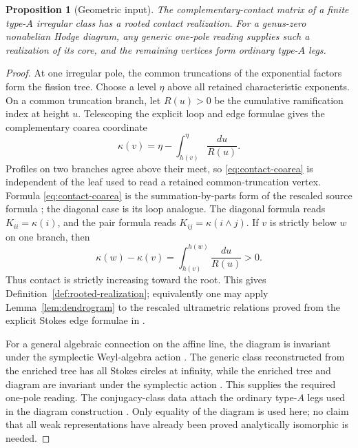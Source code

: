 \documentclass[11pt,a4paper]{amsart}
\theoremstyle{plain}
\newtheorem{proposition}[theorem]{Proposition}
\theoremstyle{definition}
\begin{document}
\begin{proposition}[Geometric input]\label{prop:geometric-input}
The complementary-contact matrix of a finite type-$A$ irregular class has a rooted contact
realization.  For a genus-zero nonabelian Hodge diagram, any generic one-pole reading supplies such
a realization of its core, and the remaining vertices form ordinary type-$A$ legs.
\end{proposition}

\begin{proof}
At one irregular pole, the common truncations of the exponential factors form the fission tree.
Choose a level $\eta$ above all retained characteristic exponents.  On a common truncation branch,
let $R(u)>0$ be the cumulative ramification index at height $u$.  Telescoping the explicit loop and
edge formulae gives the complementary coarea coordinate
\begin{equation}\label{eq:contact-coarea}
 \kappa(v)=\eta-\int_{h(v)}^\eta\frac{du}{R(u)}.
\end{equation}
Profiles on two branches agree above their meet, so \eqref{eq:contact-coarea} is independent of
the leaf used to read a retained common-truncation vertex.  Formula
\eqref{eq:contact-coarea} is the summation-by-parts form of the rescaled source formula
\cite[Lemma~4.3]{Doucot2025Graphs}; the diagonal case is its loop analogue.  The diagonal formula reads
$K_{ii}=\kappa(i)$, and the pair formula reads $K_{ij}=\kappa(i\wedge j)$.  If $v$ is strictly below
$w$ on one branch, then
\[
 \kappa(w)-\kappa(v)=\int_{h(v)}^{h(w)}\frac{du}{R(u)}>0.
\]
Thus contact is strictly increasing toward the root.  This gives
Definition~\ref{def:rooted-realization}; equivalently one may apply Lemma~\ref{lem:dendrogram} to
the rescaled ultrametric relations proved from the explicit Stokes edge formulae in
\cite[Theorem~4.2]{Doucot2025Graphs}.

For a general algebraic connection on the affine line, the diagram is invariant under the
symplectic Weyl-algebra action \cite{Doucot2021Diagrams}.  The generic class reconstructed from the
enriched tree has all Stokes circles at infinity, while the enriched tree and diagram are invariant
under the symplectic action \cite[Theorems~1.4--1.6]{Doucot2026Basic}.  This supplies the required
one-pole reading.  The conjugacy-class data attach the ordinary type-$A$ legs used in the diagram
construction \cite{BoalchYamakawa2020,Doucot2026Basic}.  Only equality of the diagram is used here;
no claim that all weak representations have already been proved analytically isomorphic is needed.
\end{proof}
\end{document}
